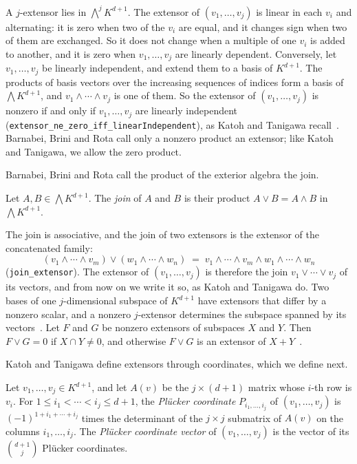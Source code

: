 A $j$-extensor lies in $\bigwedge^j K^{d+1}$. The extensor of
$(v_1, \dots, v_j)$ is linear in each $v_i$ and alternating: it is
zero when two of the $v_i$ are equal, and it changes sign when two of
them are exchanged. So it does not change when a multiple of one $v_i$
is added to another, and it is zero when $v_1, \dots, v_j$ are linearly
dependent. Conversely, let $v_1, \dots, v_j$ be linearly independent,
and extend them to a basis of $K^{d+1}$. The products of basis vectors
over the increasing sequences of indices form a basis of
$\bigwedge K^{d+1}$, and $v_1 \wedge \cdots \wedge v_j$ is one of them.
So the extensor of $(v_1, \dots, v_j)$ is nonzero if and only if
$v_1, \dots, v_j$ are linearly independent
(\texttt{extensor\_\allowbreak{}ne\_\allowbreak{}zero\_\allowbreak{}iff\_\allowbreak{}linearIndependent}),
as Katoh and Tanigawa recall~\cite[p.~651]{katohTanigawa2011}.
Barnabei, Brini and Rota call only a nonzero product an extensor; like
Katoh and Tanigawa, we allow the zero product.

Barnabei, Brini and Rota call the product of the exterior algebra the
join.

\begin{definition}[Join]
  \label{def:join}
  \leanok
  Let $A, B \in \bigwedge K^{d+1}$. The \emph{join} of $A$ and $B$ is
  their product $A \vee B = A \wedge B$ in $\bigwedge K^{d+1}$.
\end{definition}

The join is associative, and the join of two extensors is the extensor
of the concatenated family:
\[
  (v_1 \wedge \cdots \wedge v_m) \vee (w_1 \wedge \cdots \wedge w_n)
  \;=\; v_1 \wedge \cdots \wedge v_m \wedge w_1 \wedge \cdots \wedge w_n
\]
(\texttt{join\_extensor}). The extensor of $(v_1, \dots, v_j)$ is
therefore the join $v_1 \vee \cdots \vee v_j$ of its vectors, and from
now on we write it so, as Katoh and Tanigawa do. Two bases of one
$j$-dimensional subspace of $K^{d+1}$ have extensors that differ by a
nonzero scalar, and a nonzero $j$-extensor determines the subspace
spanned by its vectors~\cite[Proposition~3.4]{barnabeiBriniRota1985}.
Let $F$ and $G$ be nonzero extensors of subspaces $X$ and $Y$. Then
$F \vee G = 0$ if $X \cap Y \neq 0$, and otherwise $F \vee G$ is an
extensor of $X + Y$~\cite[Proposition~3.5]{barnabeiBriniRota1985}.

Katoh and Tanigawa define extensors through coordinates, which we
define next.

\begin{definition}
  \label{def:plucker-coords}
  \leanok
  Let $v_1, \dots, v_j \in K^{d+1}$, and let $A(v)$ be the
  $j \times (d+1)$ matrix whose $i$-th row is $v_i$. For
  $1 \le i_1 < \cdots < i_j \le d+1$, the \emph{Plücker coordinate}
  $P_{i_1, \dots, i_j}$ of $(v_1, \dots, v_j)$ is
  $(-1)^{1 + i_1 + \cdots + i_j}$ times the determinant of the
  $j \times j$ submatrix of $A(v)$ on the columns $i_1, \dots, i_j$.
  The \emph{Plücker coordinate vector} of $(v_1, \dots, v_j)$ is the
  vector of its $\binom{d+1}{j}$ Plücker coordinates.
\end{definition}

